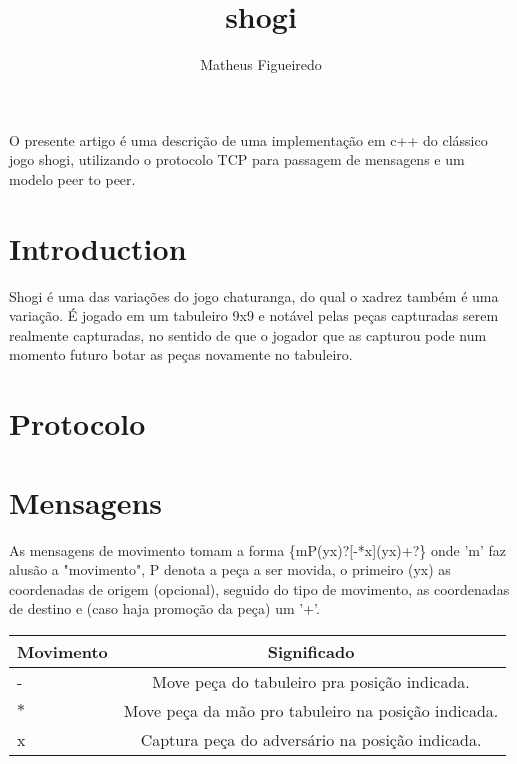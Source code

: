 \documentclass[12pt]{article}
\title{shogi}
\author{Matheus Figueiredo}
\begin{document}
\maketitle


\begin{resumo}
  O presente artigo é uma descrição de uma implementação em c++ do clássico jogo shogi, utilizando o protocolo TCP para passagem de mensagens e um modelo peer to peer.
\end{resumo}

\section{Introduction}
Shogi é uma das variações do jogo chaturanga, do qual o xadrez também é uma variação. É jogado em um tabuleiro 9x9 e notável pelas peças capturadas serem realmente capturadas, no sentido de que o jogador que as capturou pode num momento futuro botar as peças novamente no tabuleiro.\\

\section{Protocolo}
\begin{center}
  
\end{center}

\section{Mensagens}
As mensagens de movimento tomam a forma \{mP(yx)?[-*x](yx)+?\} onde 'm' faz alusão a "movimento", P denota a peça a ser movida, o primeiro (yx) as coordenadas de origem (opcional), seguido do tipo de movimento, as coordenadas de destino e (caso haja promoção da peça) um '+'.\\
      
\begin{table}[h!]
  \begin{center}
    \begin{tabular}{l|c}
      \textbf{Movimento} & \textbf{Significado}\\
      \hline
      -   & Move peça do tabuleiro pra posição indicada.\\
      $*$ & Move peça da mão pro tabuleiro na posição indicada.\\
      x   & Captura peça do adversário na posição indicada.\\
    \end{tabular}
  \end{center}
\end{table}
\end{document}
